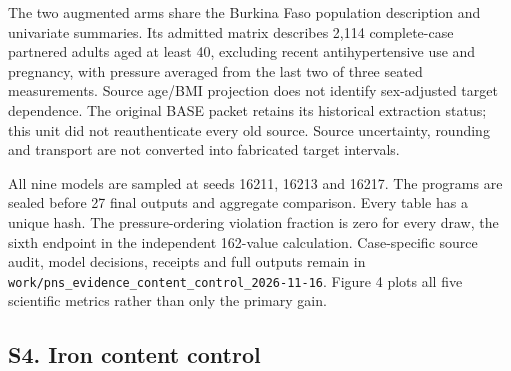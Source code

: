 \documentclass[11pt,letterpaper]{article}
\begin{document}
\endgroup

The two augmented arms share the Burkina Faso population description and univariate summaries. Its admitted matrix describes 2,114 complete-case partnered adults aged at least 40, excluding recent antihypertensive use and pregnancy, with pressure averaged from the last two of three seated measurements. Source age/\allowbreak{}BMI projection does not identify sex-adjusted target dependence. The original BASE packet retains its historical extraction status; this unit did not reauthenticate every old source. Source uncertainty, rounding and transport are not converted into fabricated target intervals.


All nine models are sampled at seeds 16211, 16213 and 16217. The programs are sealed before 27 final outputs and aggregate comparison. Every table has a unique hash. The pressure-ordering violation fraction is zero for every draw, the sixth endpoint in the independent 162-value calculation. Case-specific source audit, model decisions, receipts and full outputs remain in \texttt{work/\allowbreak{}pns\_\allowbreak{}evidence\_\allowbreak{}content\_\allowbreak{}control\_\allowbreak{}2026-\allowbreak{}11-\allowbreak{}16}. Figure 4 plots all five scientific metrics rather than only the primary gain.


\FloatBarrier


\subsection*{S4. Iron content control}

\FloatBarrier

\begingroup

\small

\renewcommand{\arraystretch}{1.22}
\end{document}
